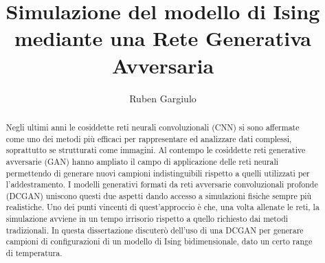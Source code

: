 \documentclass[Lau, noexaminfo, oneside]{sapthesis} %
\title{Simulazione del modello di Ising mediante una Rete Generativa Avversaria}
\author{Ruben Gargiulo}
\date{}
\begin{document}
\frontmatter
\maketitle

\begin{abstract}
Negli ultimi anni le cosiddette reti neurali convoluzionali (CNN) si sono affermate come uno dei metodi più efficaci per rappresentare ed analizzare dati complessi, soprattutto se strutturati come immagini. Al contempo le cosiddette reti generative avversarie (GAN) hanno ampliato il campo di applicazione delle reti neurali permettendo di generare nuovi campioni indistinguibili rispetto a quelli utilizzati per l'addestramento.
I modelli generativi formati da reti avversarie convoluzionali profonde (DCGAN) uniscono questi due aspetti dando accesso a simulazioni fisiche sempre più realistiche. Uno dei punti vincenti di quest'approccio è che, una volta allenate le reti, la simulazione avviene in un tempo irrisorio rispetto a quello richiesto dai metodi tradizionali. In questa dissertazione discuterò dell'uso di una DCGAN per generare campioni di configurazioni di un modello di Ising bidimensionale, dato un certo range di temperatura.
\end{abstract}
\tableofcontents
\mainmatter
\end{document}
